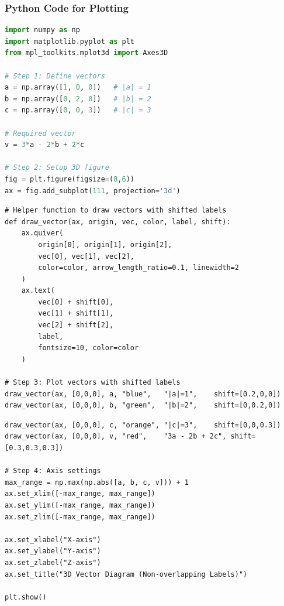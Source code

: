 \documentclass{beamer}
\theoremstyle{remark}
\numberwithin{equation}{section}
\begin{document}
\begin{frame}[fragile]
\frametitle{Python Code for Plotting}
\begin{lstlisting}[language=Python]
import numpy as np
import matplotlib.pyplot as plt
from mpl_toolkits.mplot3d import Axes3D

# Step 1: Define vectors
a = np.array([1, 0, 0])   # |a| = 1
b = np.array([0, 2, 0])   # |b| = 2
c = np.array([0, 0, 3])   # |c| = 3

# Required vector
v = 3*a - 2*b + 2*c

# Step 2: Setup 3D figure
fig = plt.figure(figsize=(8,6))
ax = fig.add_subplot(111, projection='3d')
\end{lstlisting}
\end{frame}
\begin{frame}[fragile]
\begin{lstlisting}
# Helper function to draw vectors with shifted labels
def draw_vector(ax, origin, vec, color, label, shift):
    ax.quiver(
        origin[0], origin[1], origin[2],
        vec[0], vec[1], vec[2],
        color=color, arrow_length_ratio=0.1, linewidth=2
    )
    ax.text(
        vec[0] + shift[0],
        vec[1] + shift[1],
        vec[2] + shift[2],
        label,
        fontsize=10, color=color
    )

# Step 3: Plot vectors with shifted labels
draw_vector(ax, [0,0,0], a, "blue",   "|a|=1",    shift=[0.2,0,0])
draw_vector(ax, [0,0,0], b, "green",  "|b|=2",    shift=[0,0.2,0])
\end{lstlisting}
\end{frame}
\begin{frame}[fragile]
\begin{lstlisting}
draw_vector(ax, [0,0,0], c, "orange", "|c|=3",    shift=[0,0,0.3])
draw_vector(ax, [0,0,0], v, "red",    "3a - 2b + 2c", shift=[0.3,0.3,0.3])

# Step 4: Axis settings
max_range = np.max(np.abs([a, b, c, v])) + 1
ax.set_xlim([-max_range, max_range])
ax.set_ylim([-max_range, max_range])
ax.set_zlim([-max_range, max_range])

ax.set_xlabel("X-axis")
ax.set_ylabel("Y-axis")
ax.set_zlabel("Z-axis")
ax.set_title("3D Vector Diagram (Non-overlapping Labels)")

plt.show()
\end{lstlisting}
\end{frame}
\end{document}
